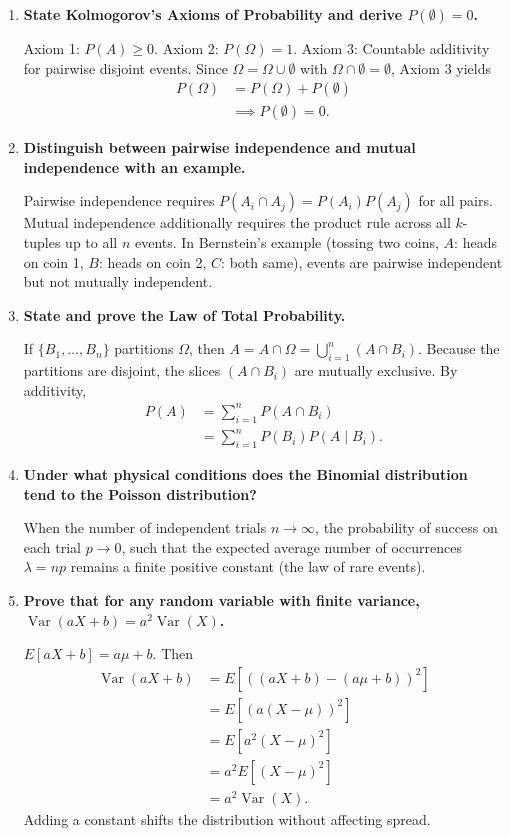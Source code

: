 \documentclass[12pt,a4paper]{article}
\newcommand{\Q}[1]{\textbf{#1}\par\noindent\ignorespaces}
\begin{document}
\begin{tcolorbox}[exambox, title={\textbf{Frequently Asked / Viva Questions}}]
\begin{enumerate}[topsep=0pt, label=\textbf{Q\arabic*.}, itemsep=5pt]
  \item \Q{State Kolmogorov's Axioms of Probability and derive $P(\emptyset) = 0$.}
  Axiom 1: $P(A) \ge 0$. Axiom 2: $P(\Omega) = 1$. Axiom 3: Countable additivity for pairwise disjoint events. Since $\Omega = \Omega \cup \emptyset$ with $\Omega \cap \emptyset = \emptyset$, Axiom 3 yields
  \[
    \begin{aligned}
      P(\Omega) &= P(\Omega) + P(\emptyset) \\[3pt]
      &\implies P(\emptyset) = 0.
    \end{aligned}
  \]

  \item \Q{Distinguish between pairwise independence and mutual independence with an example.}
  Pairwise independence requires $P(A_i \cap A_j) = P(A_i)P(A_j)$ for all pairs. Mutual independence additionally requires the product rule across all $k$-tuples up to all $n$ events. In Bernstein's example (tossing two coins, $A$: heads on coin 1, $B$: heads on coin 2, $C$: both same), events are pairwise independent but not mutually independent.

  \item \Q{State and prove the Law of Total Probability.}
  If $\{B_1, \dots, B_n\}$ partitions $\Omega$, then $A = A \cap \Omega = \bigcup_{i=1}^n (A \cap B_i)$. Because the partitions are disjoint, the slices $(A \cap B_i)$ are mutually exclusive. By additivity,
  \[
    \begin{aligned}
      P(A) &= \sum_{i=1}^n P(A \cap B_i) \\[3pt]
      &= \sum_{i=1}^n P(B_i) P(A \mid B_i).
    \end{aligned}
  \]

  \item \Q{Under what physical conditions does the Binomial distribution tend to the Poisson distribution?}
  When the number of independent trials $n \to \infty$, the probability of success on each trial $p \to 0$, such that the expected average number of occurrences $\lambda = np$ remains a finite positive constant (the law of rare events).

  \item \Q{Prove that for any random variable with finite variance, $\operatorname{Var}(aX + b) = a^2 \operatorname{Var}(X)$.}
  $E[aX + b] = a\mu + b$. Then
  \[
    \begin{aligned}
      \operatorname{Var}(aX + b) &= E[((aX + b) - (a\mu + b))^2] \\[3pt]
      &= E[(a(X - \mu))^2] \\[3pt]
      &= E[a^2 (X - \mu)^2] \\[3pt]
      &= a^2 E[(X - \mu)^2] \\[3pt]
      &= a^2 \operatorname{Var}(X).
    \end{aligned}
  \]
   Adding a constant shifts the distribution without affecting spread.


\end{enumerate}
\end{tcolorbox}
\end{document}
